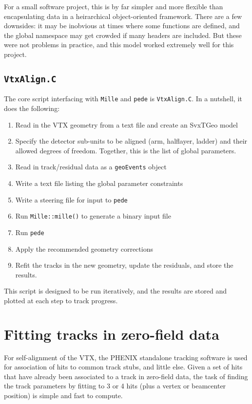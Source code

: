 \documentclass[12pt]{article}
\begin{document}
For a small software project, this is by far simpler and more flexible than encapsulating data in a heirarchical object-oriented framework. There are a few downsides: it may be inobvious at times where some functions are defined, and the global namespace may get crowded if many headers are included. But these were not problems in practice, and this model worked extremely well for this project.

\subsection{\texttt{VtxAlign.C}}
The core script interfacing with \texttt{Mille} and \texttt{pede} is \texttt{VtxAlign.C}. In a nutshell, it does the following:
\begin{enumerate}
  \item Read in the VTX geometry from a text file and create an SvxTGeo model
  \item Specify the detector sub-units to be aligned (arm, halflayer, ladder) and their allowed degrees of freedom. Together, this is the list of global parameters.
  \item Read in track/residual data as a \texttt{geoEvents} object
  \item Write a text file listing the global parameter constraints
  \item Write a steering file for input to \texttt{pede}
  \item Run \texttt{Mille::mille()} to generate a binary input file
  \item Run \texttt{pede}
  \item Apply the recommended geometry corrections
  \item Refit the tracks in the new geometry, update the residuals, and store the results.
\end{enumerate}
This script is designed to be run iteratively, and the results are stored and plotted at each step to track progress.

\section{Fitting tracks in zero-field data}
For self-alignment of the VTX, the PHENIX standalone tracking software is used for association of hits to common track stubs, and little else. Given a set of hits that have already been associated to a track in zero-field data, the task of finding the track parameters by fitting to 3 or 4 hits (plus a vertex or beamcenter position) is simple and fast to compute.
\end{document}
